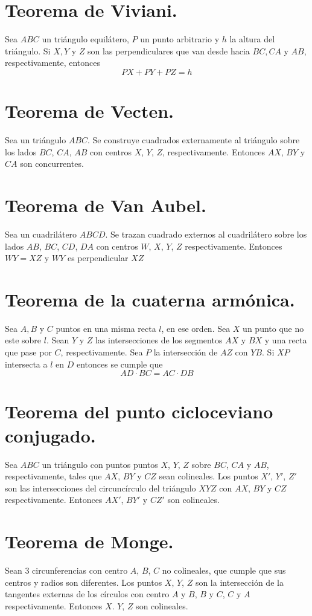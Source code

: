 \documentclass[12pt,a4paper,oneside]{book}
\begin{document}
\section{Teorema de Viviani.}
Sea $ABC$ un triángulo equilátero, $P$ un punto arbitrario y $h$ la altura del triángulo. Si $X, Y$ y $Z$ son las perpendiculares que van desde hacia $BC, CA$ y $AB$, respectivamente, entonces $$PX + PY +PZ = h$$
\section{Teorema de Vecten.}
Sea un triángulo $ABC$. Se construye cuadrados externamente al triángulo sobre los lados $BC$, $CA$, $AB$ con centros $X$, $Y$, $Z$, respectivamente. Entonces $AX$, $BY$ y $CA$ son concurrentes.
\section{Teorema de Van Aubel.}
Sea un cuadrilátero $ABCD$. Se trazan cuadrado externos al cuadrilátero sobre los lados $AB$, $BC$, $CD$, $DA$ con centros $W$, $X$, $Y$, $Z$ respectivamente. Entonces $WY= XZ$ y $WY$ es perpendicular $XZ$
\section{Teorema de la cuaterna armónica.}
Sea $A, B$ y $C$ puntos en una misma recta $l$, en ese orden.  Sea $X$ un punto que no este sobre $l$. Sean $Y$ y $Z$ las intersecciones de los segmentos $AX$ y $BX$ y una recta que pase por $C$, respectivamente. Sea $P$ la intersección de $AZ$ con $YB$. Si $XP$ intersecta a $l$ en $D$ entonces se cumple que $$AD \cdot BC= AC \cdot DB$$
\section{Teorema del punto cicloceviano conjugado.}
Sea $ABC$ un triángulo con puntos puntos $X$, $Y$, $Z$ sobre ${BC}$, ${CA}$ y ${AB}$, respectivamente, tales que $AX$, $BY$ y $CZ$ sean colineales. Los puntos $X'$, $Y'$, $Z'$ son las intersecciones del circuncírculo del triángulo $XYZ$ con $AX$, $BY$ y $CZ$ respectivamente. Entonces $AX'$, $BY'$ y $CZ'$ son colineales.
\section{Teorema de Monge.}
Sean 3 circunferencias con centro $A$, $B$, $C$ no colineales, que cumple que sus centros y radios son diferentes. Los puntos $X$, $Y$, $Z$ son la intersección de la tangentes externas de los círculos con centro $A$ y $B$, $B$ y $C$, $C$ y $A$ respectivamente. Entonces $X$. $Y$, $Z$ son colineales. 
\end{document}
